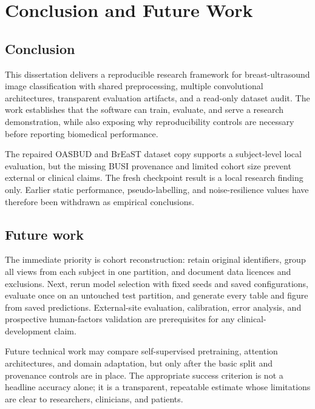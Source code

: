 \chapter{Conclusion and Future Work}

\section{Conclusion}
This dissertation delivers a reproducible research framework for breast-ultrasound image classification with shared preprocessing, multiple convolutional architectures, transparent evaluation artifacts, and a read-only dataset audit. The work establishes that the software can train, evaluate, and serve a research demonstration, while also exposing why reproducibility controls are necessary before reporting biomedical performance.

The repaired OASBUD and BrEaST dataset copy supports a subject-level local evaluation, but the missing BUSI provenance and limited cohort size prevent external or clinical claims. The fresh checkpoint result is a local research finding only. Earlier static performance, pseudo-labelling, and noise-resilience values have therefore been withdrawn as empirical conclusions.

\section{Future work}
The immediate priority is cohort reconstruction: retain original identifiers, group all views from each subject in one partition, and document data licences and exclusions. Next, rerun model selection with fixed seeds and saved configurations, evaluate once on an untouched test partition, and generate every table and figure from saved predictions. External-site evaluation, calibration, error analysis, and prospective human-factors validation are prerequisites for any clinical-development claim.

Future technical work may compare self-supervised pretraining, attention architectures, and domain adaptation, but only after the basic split and provenance controls are in place. The appropriate success criterion is not a headline accuracy alone; it is a transparent, repeatable estimate whose limitations are clear to researchers, clinicians, and patients.
